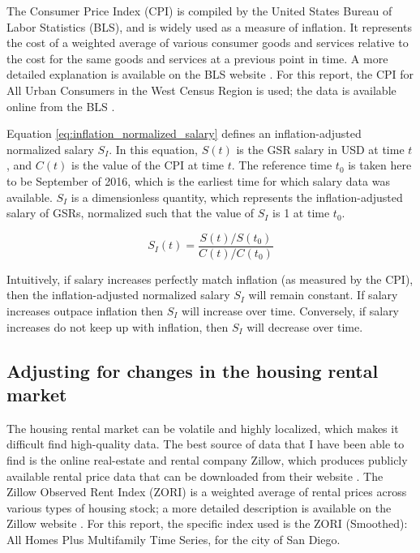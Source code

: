 \documentclass{article}
\begin{document}
The Consumer Price Index (CPI) is compiled by the United States Bureau of Labor Statistics (BLS), and is widely used as a measure of inflation. It represents the cost of a weighted average of various consumer goods and services relative to the cost for the same goods and services at a previous point in time. A more detailed explanation is available on the BLS website \citep{cpi_overview}. For this report, the CPI for All Urban Consumers in the West Census Region is used; the data is available online from the BLS \citep{cpi_data}.

Equation \ref{eq:inflation_normalized_salary} defines an inflation-adjusted normalized salary $S_I$. In this equation, $S(t)$ is the GSR salary in USD at time $t$, and $C(t)$ is the value of the CPI at time $t$. The reference time $t_0$ is taken here to be September of 2016, which is the earliest time for which salary data was available. $S_I$ is a dimensionless quantity, which represents the inflation-adjusted salary of GSRs, normalized such that the value of $S_I$ is 1 at time $t_0$.

\begin{equation}
	S_I(t) = \frac{S(t)/S(t_0)}{C(t)/C(t_0)}
	\label{eq:inflation_normalized_salary}
\end{equation}

Intuitively, if salary increases perfectly match inflation (as measured by the CPI), then the inflation-adjusted normalized salary $S_I$ will remain constant. If salary increases outpace inflation then $S_I$ will increase over time. Conversely, if salary increases do not keep up with inflation, then $S_I$ will decrease over time.

\subsection{Adjusting for changes in the housing rental market}

The housing rental market can be volatile and highly localized, which makes it difficult find high-quality data. The best source of data that I have been able to find is the online real-estate and rental company Zillow, which produces publicly available rental price data that can be downloaded from their website \citep{zori_data}. The Zillow Observed Rent Index (ZORI) is a weighted average of rental prices across various types of housing stock; a more detailed description is available on the Zillow website \citep{zori_overview}. For this report, the specific index used is the ZORI (Smoothed): All Homes Plus Multifamily Time Series, for the city of San Diego.
\end{document}
